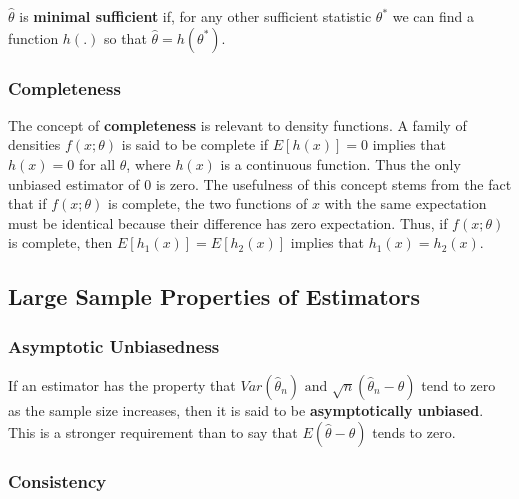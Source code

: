 \documentclass{article}
\begin{document}
\(\hat{\theta}\) is \textbf{minimal sufficient} if, for any other sufficient statistic \(\theta^*\) we can find a function \(h(.)\) so that \(\hat{\theta}=h(\theta^*)\).

\subsubsection{Completeness}

The concept of \textbf{completeness} is relevant to density functions. A family of densities \(f(x;\theta)\) is said to be complete if \(E[h(x)]=0\) implies that \(h(x)=0\) for all \(\theta\), where \(h(x)\) is a continuous function. Thus the only unbiased estimator of 0 is zero. The usefulness of this concept stems from the fact that if \(f(x;\theta)\) is complete, the two functions of \(x\) with the same expectation must be identical because their difference has zero expectation. Thus, if \(f(x;\theta)\) is complete, then \(E[h_1(x)]=E[h_2(x)]\) implies that \(h_1(x)=h_2(x)\).

\subsection{Large Sample Properties of Estimators}

\subsubsection{Asymptotic Unbiasedness}

If an estimator has the property that \(Var(\hat{\theta}_n) \text{ and } \sqrt{n}(\hat{\theta}_n-\theta)\) tend to zero as the sample size increases, then it is said to be \textbf{asymptotically unbiased}. This is a stronger requirement than to say that \(E(\hat{\theta}-\theta)\) tends to zero.

\subsubsection{Consistency}
\end{document}
